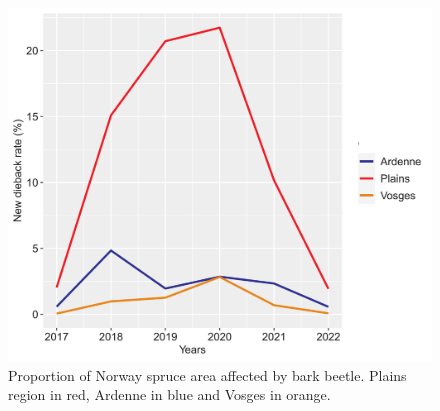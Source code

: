 \documentclass[3p,procedia]{elsarticle}
\begin{document}
\begin{figure}[htbp] 
   \centering
   \includegraphics[width=0.6 \textwidth]{Annual_evol_Ardennes_vosges_plaines.png}
    \caption{Proportion of Norway spruce area affected by bark beetle. Plains region in red, Ardenne in blue and Vosges in orange. }
    \label{evol_gen}
\end{figure}

    
\end{document}
